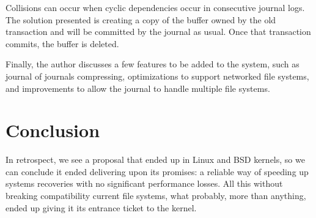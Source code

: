 \documentclass[12pt]{article}
\begin{document}
Collisions can occur when cyclic dependencies occur in consecutive journal logs. The solution presented is creating a copy of the buffer owned by the old transaction and will be committed by the journal as usual. Once that transaction commits, the buffer is deleted.

Finally, the author discusses a few features to be added to the system, such as journal of journals compressing, optimizations to support networked file systems, and improvements to allow the journal to handle multiple file systems.

\section{Conclusion}
In retrospect, we see a proposal that ended up in Linux and BSD kernels, so we can conclude it ended delivering upon its promises: a reliable way of speeding up systems recoveries with no significant performance losses. All this without breaking compatibility current file systems, what probably, more than anything, ended up giving it its entrance ticket to the kernel.



\end{document}
